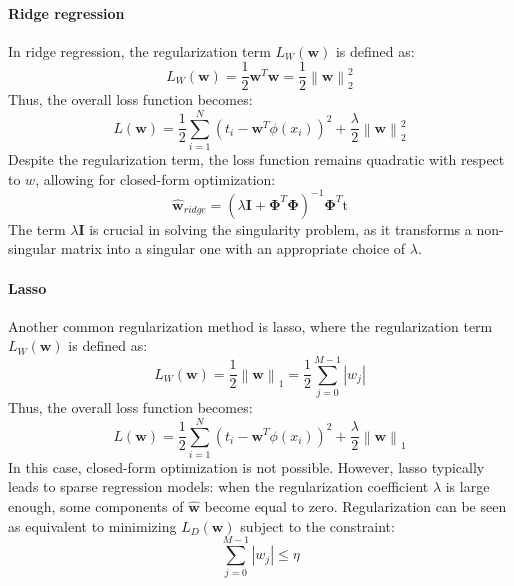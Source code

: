 \paragraph*{Ridge regression}
In ridge regression, the regularization term $L_W(\textbf{w})$ is defined as:
\[L_W(\textbf{w})=\dfrac{1}{2}\textbf{w}^T\textbf{w}=\dfrac{1}{2}\left\lVert \textbf{w} \right\rVert_2^2 \]
Thus, the overall loss function becomes:
\[L(\textbf{w})=\dfrac{1}{2}\sum_{i=1}^N \left( t_i-\textbf{w}^T\phi(x_i) \right)^2 + \dfrac{\lambda}{2}\left\lVert \textbf{w} \right\rVert_2^2\]
Despite the regularization term, the loss function remains quadratic with respect to $w$, allowing for closed-form optimization:
\[\widehat{\textbf{w}}_{ridge}=\left( \lambda\textbf{I}+\boldsymbol{\Phi}^T \boldsymbol{\Phi} \right)^{-1}\boldsymbol{\Phi}^T\text{t}\]
The term $\lambda\textbf{I}$ is crucial in solving the singularity problem, as it transforms a non-singular matrix into a singular one with an appropriate choice of $\lambda$. 

\paragraph*{Lasso}
Another common regularization method is lasso, where the regularization term $L_W(\textbf{w})$ is defined as:
\[L_W(\textbf{w})=\dfrac{1}{2}\left\lVert \textbf{w} \right\rVert_1=\dfrac{1}{2}\sum_{j=0}^{M-1}\left\lvert w_j \right\rvert\]
Thus, the overall loss function becomes:
\[L(\textbf{w})=\dfrac{1}{2}\sum_{i=1}^N \left( t_i-\textbf{w}^T\phi(x_i) \right)^2 + \dfrac{\lambda}{2}\left\lVert \textbf{w} \right\rVert_1\]
In this case, closed-form optimization is not possible. 
However, lasso typically leads to sparse regression models: when the regularization coefficient $\lambda$ is large enough, some components of $\widehat{\textbf{w}}$ become equal to zero.
Regularization can be seen as equivalent to minimizing  $L_D(\textbf{w})$ subject to the constraint:
\[\sum_{j=0}^{M-1}\left\lvert w_j \right\rvert \leq \eta\]